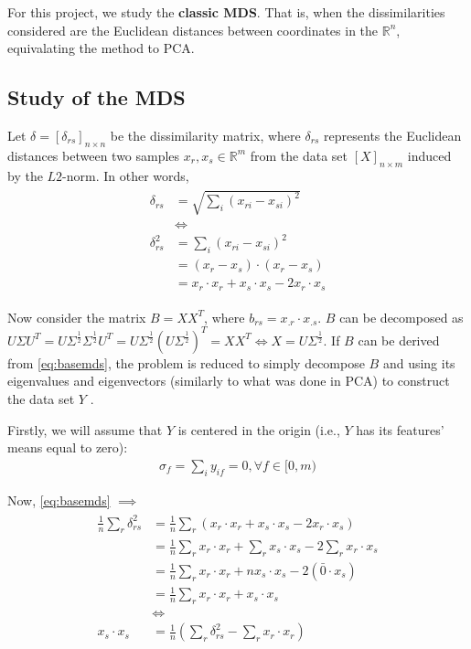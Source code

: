 For this project, we study the \textbf{classic MDS}. That is, when the dissimilarities considered are the Euclidean distances between coordinates in the $\mathbb{R}^n$, equivalating the method to PCA.

\subsection{Study of the MDS}

Let $\delta = [\delta_{rs}]_{n\times n}$ be the dissimilarity matrix, where $\delta_{rs}$ represents the Euclidean distances between two samples $x_r, x_s\in \mathbb{R}^m$ from the data set $[X]_{n\times m}$ induced by the $L2$-norm. In other words,
\begin{align}
\label{eq:basemds}
\begin{split}
  \delta_{rs}  &= \sqrt{\sum_i (x_{ri}-x_{si})^2} \\
  &\iff \\
  \delta_{rs}^2 &= \sum_i (x_{ri}-x_{si})^2 \\
  &= (x_r-x_s)\cdot (x_r-x_s) \\
  &= x_r\cdot x_r + x_s\cdot x_s -2x_r\cdot x_s
\end{split}
\end{align}

Now consider the matrix $B=XX^T$, where $b_{rs}=x_{.r}\cdot x_{.s}$. $B$ can be decomposed as $U\Sigma U^T=U\Sigma^\frac{1}{2} \Sigma^\frac{1}{2} U^T=U\Sigma^\frac{1}{2} (U\Sigma^\frac{1}{2})^T = XX^T\iff X=U\Sigma^\frac{1}{2}$. If $B$ can be derived from \ref{eq:basemds}, the problem is reduced to simply decompose $B$ and using its eigenvalues and eigenvectors (similarly to what was done in PCA) to construct the data set $Y$ \cite{cox2001}.

Firstly, we will assume that $Y$ is centered in the origin (i.e., $Y$ has its features' means equal to zero):
\begin{align}
	\label{eq:mds_zeromean}
	\sigma_f = \sum_i y_{if} = 0, \forall f\in [0, m)
\end{align}

Now, \ref{eq:basemds} $\implies$
\begin{align}
\label{eq:xsderivation}
\begin{split}
\frac{1}{n} \sum_r \delta_{rs}^2
&= \frac{1}{n} \sum_r (x_r\cdot x_r + x_s\cdot x_s -2x_r\cdot x_s) \\
&= \frac{1}{n} \sum_r x_r\cdot x_r + \sum_r x_s\cdot x_s -2 \sum_r x_r\cdot x_s \\
&= \frac{1}{n} \sum_r x_r\cdot x_r + nx_s\cdot x_s -2 (\bar{0} \cdot x_s) \\
&= \frac{1}{n} \sum_r x_r\cdot x_r + x_s\cdot x_s \\
&\iff \\
x_s\cdot x_s &= \frac{1}{n} (\sum_r \delta_{rs}^2 - \sum_r x_r\cdot x_r)
\end{split}
\end{align}

